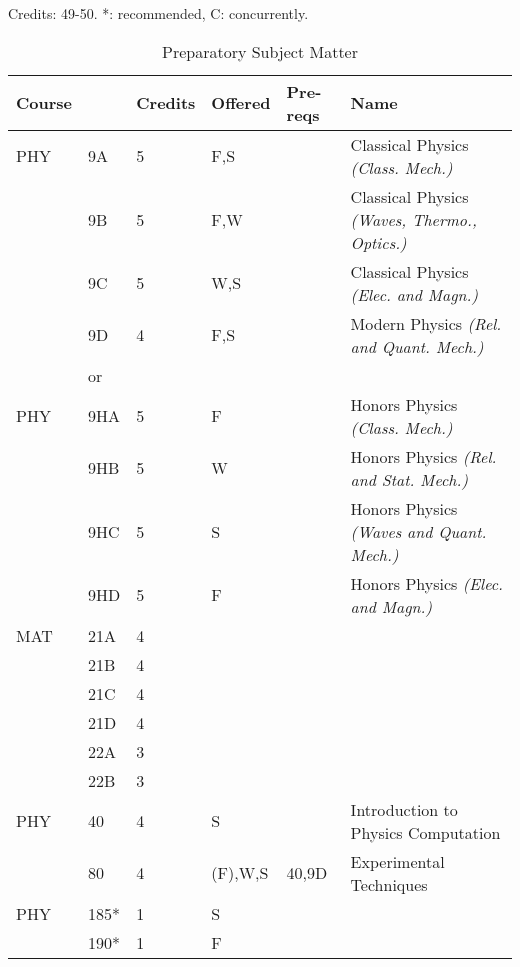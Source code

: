\documentclass[12pt]{article}
\begin{document}
\begin{table}
\caption{\label{tbl:prep}Preparatory Subject Matter}
\noindent
\vskip 0.25cm
Credits:  49-50. *: recommended, C: concurrently.\\
\begin{tabular}{|llllll|}
\hline
Course & & Credits & Offered & Pre-reqs & Name \\
\hline
PHY & 9A & 5 & F,S & & Classical Physics {\it (Class. Mech.)}\\ 
    & 9B & 5 & F,W & & Classical Physics {\it (Waves, Thermo., Optics.)}\\ 
    & 9C & 5 & W,S & & Classical Physics {\it (Elec. and Magn.)}\\ 
    & 9D & 4 & F,S & & Modern Physics {\it (Rel. and Quant. Mech.)}\\ 
\hline
&or&&\\
\hline
PHY & 9HA & 5 & F & & Honors Physics {\it (Class. Mech.)}\\ 
    & 9HB & 5 & W & & Honors Physics {\it (Rel. and Stat. Mech.)}\\ 
    & 9HC & 5 & S & & Honors Physics {\it (Waves and Quant. Mech.)}\\ 
    & 9HD & 5 & F & & Honors Physics {\it (Elec. and Magn.)}\\ 
\hline
\hline
MAT & 21A & 4 & & &\\ 
    & 21B & 4 & & &\\ 
    & 21C & 4 & & &\\ 
    & 21D & 4 & & &\\ 
    & 22A & 3 & & &\\ 
    & 22B & 3 & & &\\ 
PHY & 40  & 4 & S & & Introduction to Physics Computation \\ 
    & 80  & 4 & (F),W,S & 40,9D & Experimental Techniques \\ 
PHY & 185* & 1 & S & & \\ 
    & 190* & 1 & F & & \\ 
\hline
\end{tabular}
\end{table}
\end{document}
